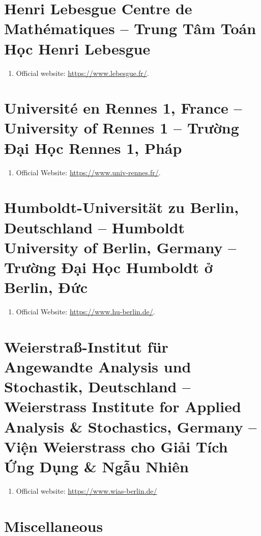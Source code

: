\documentclass{article}
\begin{document}
\section{Henri Lebesgue Centre de Math\'ematiques -- Trung Tâm Toán Học Henri Lebesgue}
\begin{enumerate}
	\item Official website: \url{https://www.lebesgue.fr/}.
\end{enumerate}


\section{Universit\'e en Rennes 1, France -- University of Rennes 1 -- Trường Đại Học Rennes 1, Pháp}
\begin{enumerate}
	\item Official Website: \url{https://www.univ-rennes.fr/}.
\end{enumerate}


\section{Humboldt-Universität zu Berlin, Deutschland -- Humboldt University of Berlin, Germany -- Trường Đại Học Humboldt ở Berlin, Đức}
\begin{enumerate}
	\item Official Website: \url{https://www.hu-berlin.de/}.
\end{enumerate}



\section{Weierstraß-Institut für Angewandte Analysis und Stochastik, Deutschland -- Weierstrass Institute for Applied Analysis \& Stochastics, Germany -- Viện Weierstrass cho Giải Tích Ứng Dụng \& Ngẫu Nhiên}
\begin{enumerate}
	\item Official website: \url{https://www.wias-berlin.de/}
\end{enumerate}


\section{Miscellaneous}


\printbibliography[heading=bibintoc]
	
\end{document}
